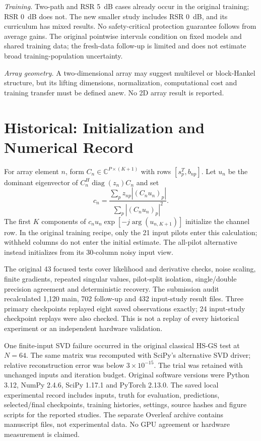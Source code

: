 \documentclass[journal]{IEEEtran}
\DeclareMathOperator{\diag}{diag}
\begin{document}
\textit{Training.} Two-path and RSR 5~dB cases already occur in the original
training; RSR 0~dB does not. The new smaller study includes RSR 0~dB,
and its curriculum has mixed results. No safety-critical protection
guarantee follows from average gains. The original pointwise
intervals condition on fixed models and shared training data; the
fresh-data follow-up is limited and does not estimate broad
training-population uncertainty.

\textit{Array geometry.} A two-dimensional array may suggest multilevel
or block-Hankel structure, but its lifting dimensions, normalization,
computational cost and training transfer must be defined anew. No 2D
array result is reported.

\section{Historical: Initialization and Numerical Record}
For array element $n$, form $C_n\in\mathbb C^{P\times(K+1)}$ with rows
$[s_p^T,b_{np}]$. Let $u_n$ be the dominant eigenvector of
$C_n^H\diag(z_n)C_n$ and set
\begin{equation}
 c_n=\frac{\sum_p z_{np}|(C_nu_n)_p|}{\sum_p|(C_nu_n)_p|^2}.
\end{equation}
The first $K$ components of $c_nu_n\exp[-j\arg(u_{n,K+1})]$ initialize
the channel row. In the original training recipe, only the 21 input pilots
enter this calculation; withheld columns do not enter the initial estimate.
The all-pilot alternative instead initializes from its 30-column noisy input view.

The original 43 focused tests cover likelihood and derivative checks,
noise scaling, finite gradients, repeated singular values, pilot-split
isolation, single/double precision agreement and deterministic recovery.
The submission audit recalculated 1,120 main, 702 follow-up and 432
input-study result files. Three primary checkpoints replayed eight saved
observations exactly; 24 input-study checkpoint replays were also checked.
This is not a replay of every historical experiment or an independent
hardware validation.

One finite-input SVD failure occurred in the original classical HS-GS
test at $N=64$. The same matrix was recomputed with SciPy's alternative
SVD driver; relative reconstruction error was below $3\times10^{-15}$.
The trial was retained with unchanged inputs and iteration budget.
Original software versions were Python 3.12, NumPy 2.4.6, SciPy 1.17.1
and PyTorch 2.13.0. The saved local experimental record includes inputs, truth
for evaluation, predictions, selected/final checkpoints, training histories,
settings, source hashes and figure scripts for the reported studies.
The separate Overleaf archive contains manuscript files, not experimental
data. No GPU agreement or hardware measurement is claimed.


\end{document}
